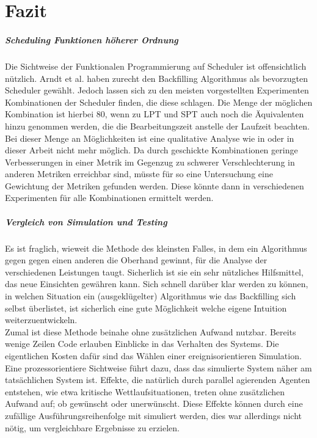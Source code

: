 \chapter{Fazit}

\paragraph{Scheduling Funktionen höherer Ordnung}
Die Sichtweise der Funktionalen Programmierung auf Scheduler ist offensichtlich nützlich. Arndt et al. \cite{Arn99} haben zurecht den Backfilling Algorithmus als bevorzugten Scheduler gewählt. Jedoch lassen sich zu den meisten vorgestellten Experimenten Kombinationen der Scheduler finden, die diese schlagen. Die Menge der möglichen Kombination ist hierbei 80, wenn zu LPT und SPT auch noch die Äquivalenten hinzu genommen werden, die die Bearbeitungszeit anstelle der Laufzeit beachten. Bei dieser Menge an Möglichkeiten ist eine qualitative Analyse wie in \cite{Arn99} oder in dieser Arbeit nicht mehr möglich. Da durch geschickte Kombinationen geringe Verbesserungen in einer Metrik im Gegenzug zu schwerer Verschlechterung in anderen Metriken erreichbar sind, müsste für so eine Untersuchung eine Gewichtung der Metriken gefunden werden. Diese könnte dann in verschiedenen Experimenten für alle Kombinationen ermittelt werden.


\paragraph{Vergleich von Simulation und Testing}
Es ist fraglich, wieweit die Methode des kleinsten Falles, in dem ein Algorithmus gegen gegen einen anderen die Oberhand gewinnt, für die Analyse der verschiedenen Leistungen taugt. Sicherlich ist sie ein sehr nützliches Hilfsmittel, das neue Einsichten gewähren kann. Sich schnell darüber klar werden zu können, in welchen Situation ein (ausgeklügelter) Algorithmus wie das Backfilling sich selbst überlistet, ist sicherlich eine gute Möglichkeit welche eigene Intuition weiterzuentwickeln.\\
Zumal ist diese Methode beinahe ohne zusätzlichen Aufwand nutzbar. Bereits wenige Zeilen Code erlauben Einblicke in das Verhalten des Systems. Die eigentlichen Kosten dafür sind das Wählen einer ereignisorientieren Simulation. Eine prozessorientiere Sichtweise führt dazu, dass das simulierte System näher am tatsächlichen System ist. Effekte, die natürlich durch parallel agierenden Agenten entstehen, wie etwa kritische Wettlaufsituationen, treten ohne zusätzlichen Aufwand auf; ob gewünscht oder unerwünscht. Diese Effekte können durch eine zufällige Ausführungsreihenfolge mit simuliert werden, dies war allerdings nicht nötig, um vergleichbare Ergebnisse zu erzielen.

